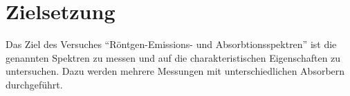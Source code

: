 \section{Zielsetzung}
\label{sec:Ziel}
Das Ziel des Versuches \enquote{Röntgen-Emissions- und Absorbtionsspektren}
ist die genannten Spektren zu messen und auf die charakteristischen Eigenschaften
zu untersuchen. Dazu werden mehrere Messungen mit unterschiedlichen Absorbern
durchgeführt.\\
